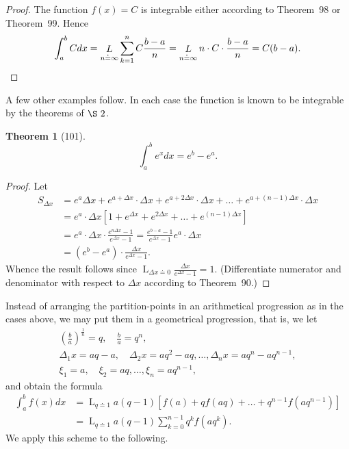 \documentclass[a4paper,12pt]{book}[2004/02/16]
\providecommand{\colorbox}[2]{#2}
\newcommand{\correction}[2]{\colorbox{corr}{#1}}
\providecommand{\hyperlink}[2]{#2}
\providecommand{\hypertarget}[2]{#2}
\theoremstyle{ilemma}
\theoremstyle{itheorem}
\newtheorem{theorem}{Theorem}
\theoremstyle{iother}
\theoremstyle{icorollary}
\theoremstyle{numcorollary}
\theoremstyle{idefinition}
\renewcommand{\dfrac}[2]{\frac{#1}{#2}}%
\begin{document}
\begin{proof}
The function $f(x)=C$ is integrable either according to Theorem~\hyperlink{thm98}{98} or
Theorem~\hyperlink{thm99}{99}. Hence
\[
\int_a^b Cdx =
  \mathop{L}_{n\doteq\infty} \sum_{k=1}^n C\frac{b-a}{n} =
  \mathop{L}_{n\doteq\infty} n\cdot C\cdot \frac{b-a}{n} =
  C(b-a).\qedhere
\]
\end{proof}

A few other examples follow. In each case the function is known to be
integrable by the theorems of $\hyperlink{chVIIIsec2}{\S~2}$.

\begin{theorem}[101]\hypertarget{thm101}{}\label{t101p160}
\[
  \int_a^b e^xdx=e^b-e^a.
\]
\end{theorem}

\begin{proof}

Let
\begin{align*}
S_{\Delta x}
  &= e^a\Delta x + e^{a+\Delta x} \cdot \Delta x +
     e^{a+2\Delta x}\cdot\Delta x + \ldots +
     e^{a+(n-1)\Delta x} \cdot \Delta x \\
  &= e^a \cdot\Delta x[1+e^{\Delta x} +
     e^{2\Delta x} + \ldots + e^{(n-1)\Delta x}] \\
  &= e^a\cdot\Delta x\cdot\frac{e^{n\Delta x}-1}{e^{\Delta x}-1} =
    \frac{e^{b-a}-1}{e^{\Delta x}-1}e^a\cdot\Delta x \\
  &= (e^b-e^a) \cdot \frac{\Delta x}{e^{\Delta x}-1}.
\end{align*}
Whence the result follows since $\displaystyle\mathop{L}_{\Delta
x\doteq 0} \dfrac{\Delta x}{e^{\Delta x}-1}=1$. (Differentiate
numerator and denominator with respect to $\Delta x$ according to
Theorem~\hyperlink{thm90}{90}.\correction{)}{}
\end{proof}

Instead of arranging the partition-points in an arithmetical
progression as in the cases above, we may put them in a geometrical
progression, that is, we let
\begin{gather*}
  \left(\frac ba \right)^{\frac1n} = q, \quad \frac ba = q^n,
\\
  \Delta_1 x = aq-a, \quad
  \Delta_2 x = aq^2-aq, \ldots,
  \Delta_n x = aq^n-aq^{n-1},
\\
  \xi_1 = a, \quad \xi_2 = aq, \ldots, \xi_n = aq^{n-1},
\end{gather*}
and obtain the formula
\begin{align*}
  \int_a^b f(x) dx
&= \mathop{L}_{q\doteq 1}
     a(q-1) [f(a) + qf(aq) + \ldots + q^{n-1} f(aq^{n-1})]
\\
&= \mathop{L}_{q\doteq 1} a(q-1) \sum\limits_{k=0}^{n-1} q^k f(aq^k).
\end{align*}
We apply this scheme to the following.
\end{document}
